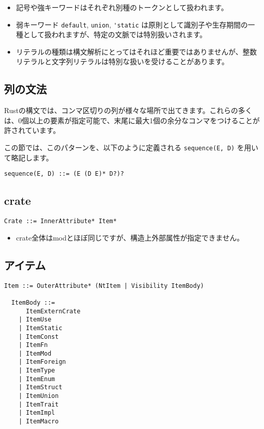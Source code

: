 \documentclass[dvipdfmx,uplatex,papersize,a4paper,10pt]{jsbook}
\theoremstyle{definition}
\begin{document}
\begin{itemize}
  \item 記号や強キーワードはそれぞれ別種のトークンとして扱われます。
  \item 弱キーワード \verb|default|, \verb|union|, \verb|'static| は原則として識別子や生存期間の一種として扱われますが、特定の文脈では特別扱いされます。
  \item リテラルの種類は構文解析にとってはそれほど重要ではありませんが、整数リテラルと文字列リテラルは特別な扱いを受けることがあります。
\end{itemize}

\subsection{列の文法}

Rustの構文では、コンマ区切りの列が様々な場所で出てきます。これらの多くは、0個以上の要素が指定可能で、末尾に最大1個の余分なコンマをつけることが許されています。

この節では、このパターンを、以下のように定義される \verb|sequence(E, D)| を用いて略記します。

\begin{lstlisting}[language=BNFLike, gobble=2]
  sequence(E, D) ::= (E (D E)* D?)?
\end{lstlisting}

\subsection{crate}

\begin{lstlisting}[language=BNFLike, gobble=2]
  Crate ::= InnerAttribute* Item*
\end{lstlisting}

\begin{itemize}
  \item crate全体はmodとほぼ同じですが、構造上外部属性が指定できません。
\end{itemize}

\subsection{アイテム}

\begin{lstlisting}[language=BNFLike, gobble=2]
  Item ::= OuterAttribute* (NtItem | Visibility ItemBody)

  ItemBody ::=
      ItemExternCrate
    | ItemUse
    | ItemStatic
    | ItemConst
    | ItemFn
    | ItemMod
    | ItemForeign
    | ItemType
    | ItemEnum
    | ItemStruct
    | ItemUnion
    | ItemTrait
    | ItemImpl
    | ItemMacro
\end{lstlisting}
\end{document}
